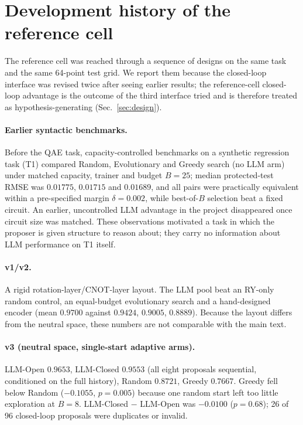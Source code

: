 \documentclass[11pt]{article}
\begin{document}
\section{Development history of the reference cell}
\label{app:history}

The reference cell was reached through a sequence of designs on the same task and the
same 64-point test grid. We report them because the closed-loop interface was revised
twice after seeing earlier results; the reference-cell closed-loop advantage is the
outcome of the third interface tried and is therefore treated as
hypothesis-generating (Sec.~\ref{sec:design}).

\paragraph{Earlier syntactic benchmarks.}
Before the QAE task, capacity-controlled benchmarks on a synthetic regression task
(T1) compared Random, Evolutionary and Greedy search (no LLM arm) under matched
capacity, trainer and budget $B=25$; median protected-test RMSE was $0.01775$,
$0.01715$ and $0.01689$, and all pairs were practically equivalent within a
pre-specified margin $\delta=0.002$, while best-of-$B$ selection beat a fixed circuit.
An earlier, uncontrolled LLM advantage in the project disappeared once circuit size was
matched. These observations motivated a task in which the proposer is given structure
to reason about; they carry no information about LLM performance on T1 itself.

\paragraph{v1/v2.} A rigid rotation-layer/CNOT-layer layout. The LLM pool beat an
RY-only random control, an equal-budget evolutionary search and a hand-designed encoder
(mean $0.9700$ against $0.9424$, $0.9005$, $0.8889$). Because the layout differs from
the neutral space, these numbers are not comparable with the main text.

\paragraph{v3 (neutral space, single-start adaptive arms).} LLM-Open $0.9653$,
LLM-Closed $0.9553$ (all eight proposals sequential, conditioned on the full history),
Random $0.8721$, Greedy $0.7667$. Greedy fell below Random ($-0.1055$, $p=0.005$)
because one random start left too little exploration at $B=8$. LLM-Closed $-$ LLM-Open
was $-0.0100$ ($p=0.68$); 26 of 96 closed-loop proposals were duplicates or invalid.
\end{document}
